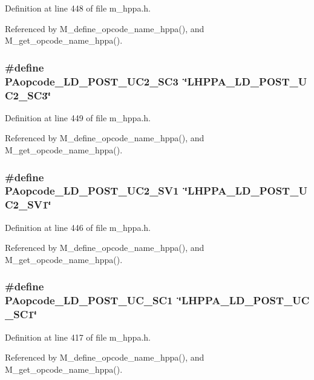 Definition at line 448 of file m\_\-hppa.h.

Referenced by M\_\-define\_\-opcode\_\-name\_\-hppa(), and M\_\-get\_\-opcode\_\-name\_\-hppa().
\subsubsection{\setlength{\rightskip}{0pt plus 5cm}\#define PAopcode\_\-LD\_\-POST\_\-UC2\_\-SC3~\char`\"{}LHPPA\_\-LD\_\-POST\_\-UC2\_\-SC3\char`\"{}}\label{m__hppa_8h_cb7df288ebf52e8a5268a4a67b803859}




Definition at line 449 of file m\_\-hppa.h.

Referenced by M\_\-define\_\-opcode\_\-name\_\-hppa(), and M\_\-get\_\-opcode\_\-name\_\-hppa().
\subsubsection{\setlength{\rightskip}{0pt plus 5cm}\#define PAopcode\_\-LD\_\-POST\_\-UC2\_\-SV1~\char`\"{}LHPPA\_\-LD\_\-POST\_\-UC2\_\-SV1\char`\"{}}\label{m__hppa_8h_e9e3fcfa9c5f52e8c820a5f758f9cbc1}




Definition at line 446 of file m\_\-hppa.h.

Referenced by M\_\-define\_\-opcode\_\-name\_\-hppa(), and M\_\-get\_\-opcode\_\-name\_\-hppa().
\subsubsection{\setlength{\rightskip}{0pt plus 5cm}\#define PAopcode\_\-LD\_\-POST\_\-UC\_\-SC1~\char`\"{}LHPPA\_\-LD\_\-POST\_\-UC\_\-SC1\char`\"{}}\label{m__hppa_8h_f13d66ace2e3c465210780db81c6a6c6}




Definition at line 417 of file m\_\-hppa.h.

Referenced by M\_\-define\_\-opcode\_\-name\_\-hppa(), and M\_\-get\_\-opcode\_\-name\_\-hppa().
